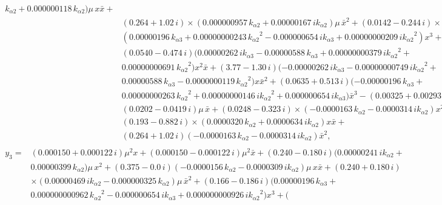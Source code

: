 \documentclass[openacc]{rsproca_new}%
\begin{document}
\begin{appendices}
\begin{align}
\begin{split}
{  k_{\alpha 2}}+ 0.000000118\,{k_{\alpha 2}} ) \mu\,x\bar x+\\& (  0.264+ 1.02\,i
  ) \times
  (  0.000000957\,{k_{\alpha 2}}+ 0.00000167\,i{k_{\alpha 2}}
  ) \mu\,{\bar x}^{2}+ (  0.0142- 0.244\,i )\times \\
  & (
  0.00000196\,{k_{\alpha 3}}+ 0.00000000243\,{{k_{\alpha 2}}}^{2}- 0.000000654\,i
  {k_{\alpha 3}}+ 0.00000000209\,i{{k_{\alpha 2}}}^{2} ) {x}^{3}+ \\
  & (
  0.0540- 0.474\,i )  (  0.00000262\,i{k_{\alpha 3}}- 0.00000588
  \,{k_{\alpha 3}}+ 0.00000000379\,i{{k_{\alpha 2}}}^{2}+\\& 0.00000000691\,{{k_{\alpha 2}
  }}^{2} ) {x}^{2}\bar x+ (  3.77- 1.30\,i )  ( -
  0.00000262\,i{k_{\alpha 3}}- 0.00000000749\,i{{k_{\alpha 2}}}^{2}+\\& 0.00000588\,
  {k_{\alpha 3}}- 0.0000000119\,{{k_{\alpha 2}}}^{2} ) x{\bar x}^{2}+ (
  0.0635+ 0.513\,i )  ( - 0.00000196\,{k_{\alpha 3}}+\\&
  0.00000000263\,{{k_{\alpha 2}}}^{2}+
  0.00000000146\,i{{k_{\alpha 2}}}^{2}+
  0.000000654\,i{k_{\alpha 3}} ) {\bar x}^{3}- (  0.00325+ 0.00293\,i
  ) \mu\,x- \\& (  0.0202- 0.0419\,i ) \mu\,\bar x+(
  0.0248- 0.323\,i ) \times
   ( - 0.0000163\,{k_{\alpha 2}}- 0.0000314\,i
  {k_{\alpha 2}} ) {x}^{2}+\\&(  0.193- 0.882\,i ) \times  (
  0.0000320\,{k_{\alpha 2}}+ 0.0000634\,i{k_{\alpha 2}} ) x\bar x+
  \\& (  0.264
  + 1.02\,i )  ( - 0.0000163\,{k_{\alpha 2}}- 0.0000314\,i{k_{\alpha 2}
  } ) {\bar x}^{2},
  \end{split}
  \end{align}
  \begin{align}
  \begin{split}
  y_3=&(  0.000150+ 0.000122\,i ) {\mu}^{2}x+ (  0.000150-
  0.000122\,i ) {\mu}^{2}\bar x+ (  0.240- 0.180\,i )
  (  0.00000241\,i{  k_{\alpha 2}}+ \\&0.00000399\,{  k_{\alpha 2}} ) \mu\,{x
  }^{2}+ (  0.375- 0.0\,i )  ( - 0.0000156\,{  k_{\alpha 2}}-
  0.0000309\,i{  k_{\alpha 2}} ) \mu\,x\bar x+ (  0.240+ 0.180\,i
  ) \\& \times (  0.00000469\,i{  k_{\alpha 2}}- 0.000000325\,{  k_{\alpha 2}}
  ) \mu\,{\bar x}^{2}+ (  0.166- 0.186\,i )  (
  0.00000196\,{  k_{\alpha 3}}+ \\
  & 0.000000000962\,{{  k_{\alpha 2}}}^{2}- 0.000000654\,
  i{  k_{\alpha 3}}+ 0.000000000926\,i{{  k_{\alpha 2}}}^{2} ) {x}^{3}+ (

\end{split}
\end{align}
\end{appendices}
\end{document}
